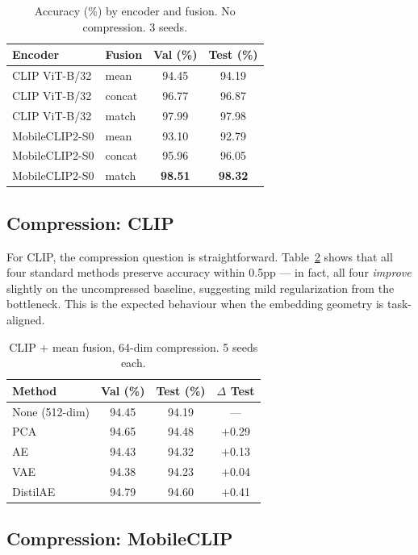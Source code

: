 \documentclass[10pt,twocolumn]{article}
\begin{document}
\begin{table}[h]
\centering
\caption{Accuracy (\%) by encoder and fusion. No compression. 3 seeds.}
\label{tab:fusion}
\begin{tabular}{llcc}
\toprule
Encoder & Fusion & Val (\%) & Test (\%) \\
\midrule
CLIP ViT-B/32   & mean   & 94.45 & 94.19 \\
CLIP ViT-B/32   & concat & 96.77 & 96.87 \\
CLIP ViT-B/32   & match  & 97.99 & 97.98 \\
\midrule
MobileCLIP2-S0  & mean   & 93.10 & 92.79 \\
MobileCLIP2-S0  & concat & 95.96 & 96.05 \\
MobileCLIP2-S0  & match  & \textbf{98.51} & \textbf{98.32} \\
\bottomrule
\end{tabular}
\end{table}

\subsection{Compression: CLIP}

For CLIP, the compression question is straightforward. Table~\ref{tab:clip_compression}
shows that all four standard methods preserve accuracy within 0.5pp ---
in fact, all four \emph{improve} slightly on the uncompressed baseline,
suggesting mild regularization from the bottleneck. This is the expected
behaviour when the embedding geometry is task-aligned.

\begin{table}[h]
\centering
\caption{CLIP + mean fusion, 64-dim compression. 5 seeds each.}
\label{tab:clip_compression}
\begin{tabular}{lccc}
\toprule
Method & Val (\%) & Test (\%) & $\Delta$ Test \\
\midrule
None (512-dim)  & 94.45 & 94.19 & --- \\
PCA             & 94.65 & 94.48 & $+$0.29 \\
AE              & 94.43 & 94.32 & $+$0.13 \\
VAE             & 94.38 & 94.23 & $+$0.04 \\
DistilAE        & 94.79 & 94.60 & $+$0.41 \\
\bottomrule
\end{tabular}
\end{table}

\subsection{Compression: MobileCLIP}
\end{document}
